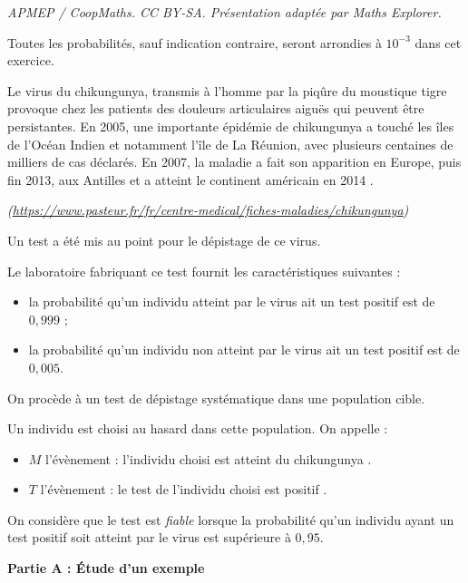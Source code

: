 \documentclass[10pt]{article}
\begin{document}
\noindent\textit{APMEP / CoopMaths. CC BY-SA. Présentation adaptée par Maths Explorer.}\par\medskip
\medskip

Toutes les probabilités, sauf indication contraire, seront arrondies à $10^{-3}$ dans cet exercice.

\og Le virus du chikungunya, transmis à l'homme par la piqûre du moustique tigre provoque chez les patients des douleurs articulaires aiguës qui peuvent être persistantes. En 2005, une importante épidémie de chikungunya a touché les îles de l'Océan Indien et notamment l'île de La Réunion, avec plusieurs centaines de milliers de cas déclarés. En 2007, la maladie a fait son apparition en Europe, puis fin 2013, aux Antilles et a atteint le continent américain en 2014 \fg{}.

\emph{(\href{https://www.pasteur.fr/fr/centre-medical/fiches-maladies/chikungunya}{https://www.pasteur.fr/fr/centre-medical/fiches-maladies/chikungunya})}

Un test a été mis au point pour le dépistage de ce virus.

Le laboratoire fabriquant ce test fournit les caractéristiques suivantes :

\begin{itemize}
\item la probabilité qu'un individu atteint par le virus ait un test positif est de $0,999$ ;
\item la probabilité qu'un individu non atteint par le virus ait un test positif est de $0,005$.
\end{itemize}

On procède à un test de dépistage systématique dans une population cible.

Un individu est choisi au hasard dans cette population. On appelle :

\begin{itemize}
\item $M$ l'évènement : \og l'individu choisi est atteint du chikungunya \fg.
\item $T$ l'évènement : \og le test de l'individu choisi est positif \fg.
\end{itemize}

On considère que le test est \emph{fiable} lorsque la probabilité qu'un individu ayant un test positif soit atteint par le virus est supérieure à $0,95$.

\bigskip

\textbf{Partie A : Étude d'un exemple}
\end{document}

